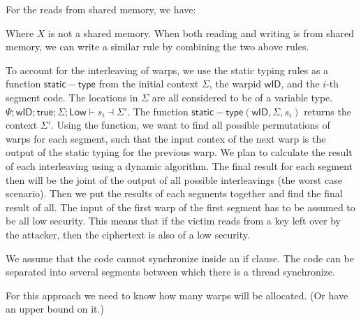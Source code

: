
For the reads from shared memory, we have:

\begin{mathpar}
\end{mathpar}
Where $X$ is not a shared memory.
When both reading and writing is from shared memory, we can write a similar rule by combining the two above rules.


    To account for the interleaving of warps, we use the static typing rules as a function $\mathsf{static-type}$ from the initial context $\Sigma$, the warpid $\mathsf{wID}$, and the $i$-th segment code.
    The locations in $\Sigma$ are all considered to be of a variable type.
    $\Psi; \mathsf{wID}; \mathsf{true};  \Sigma; \mathsf{Low}\vdash s_i \dashv \Sigma'$.
    The function $\mathsf{static-type} (\mathsf{wID}, \Sigma, s_i)$ returns the context $\Sigma'$.
    Using the function, we want to find all possible permutations of warps for each  segment, such that the input contex of the next warp is the output of the static typing for the previous warp.
    We plan to calculate the result of each interleaving using a dynamic algorithm.
    The final result for each segment then will be the joint of the output of all possible interleavings (the worst case scenario).
    Then we put the results of each segments together and find the final result of all.
    The input of the first warp of the first segment has to be assumed to be all low security.
    This means that if the victim reads from a key left over by the attacker, then the ciphertext is also of a low security.
    
We assume that the code cannot synchronize inside an if clause. The code can be separated into several segments between which there is a thread synchronize.

For this approach we need to know how many warps will be allocated.
(Or have an upper bound on it.)









